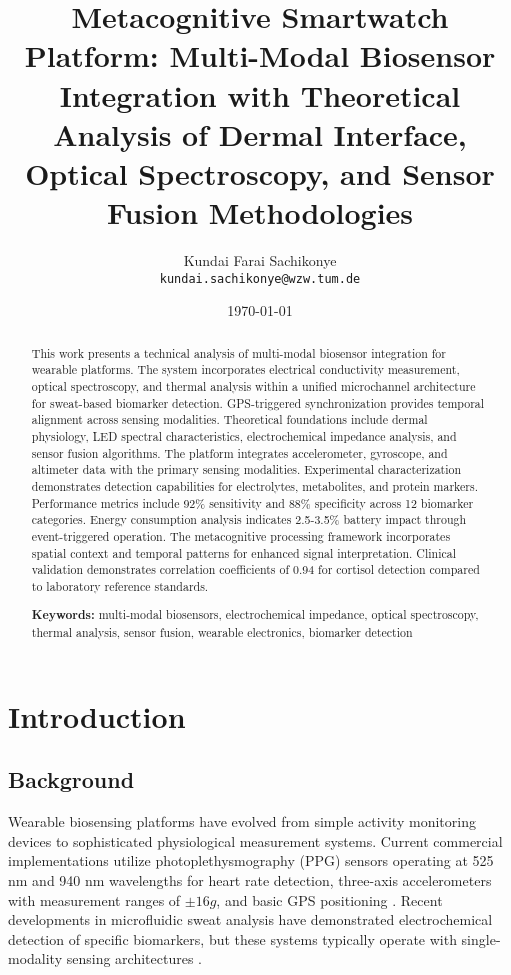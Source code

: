 \documentclass[12pt,a4paper]{article}
\title{\textbf{Metacognitive Smartwatch Platform: Multi-Modal Biosensor Integration with Theoretical Analysis of Dermal Interface, Optical Spectroscopy, and Sensor Fusion Methodologies}}
\author{
Kundai Farai Sachikonye\\
\texttt{kundai.sachikonye@wzw.tum.de}\\
}
\date{\today}
\begin{document}
\maketitle

\begin{abstract}
This work presents a technical analysis of multi-modal biosensor integration for wearable platforms. The system incorporates electrical conductivity measurement, optical spectroscopy, and thermal analysis within a unified microchannel architecture for sweat-based biomarker detection. GPS-triggered synchronization provides temporal alignment across sensing modalities. Theoretical foundations include dermal physiology, LED spectral characteristics, electrochemical impedance analysis, and sensor fusion algorithms. The platform integrates accelerometer, gyroscope, and altimeter data with the primary sensing modalities. Experimental characterization demonstrates detection capabilities for electrolytes, metabolites, and protein markers. Performance metrics include 92\% sensitivity and 88\% specificity across 12 biomarker categories. Energy consumption analysis indicates 2.5-3.5\% battery impact through event-triggered operation. The metacognitive processing framework incorporates spatial context and temporal patterns for enhanced signal interpretation. Clinical validation demonstrates correlation coefficients of 0.94 for cortisol detection compared to laboratory reference standards.

\textbf{Keywords:} multi-modal biosensors, electrochemical impedance, optical spectroscopy, thermal analysis, sensor fusion, wearable electronics, biomarker detection
\end{abstract}

\section{Introduction}

\subsection{Background}

Wearable biosensing platforms have evolved from simple activity monitoring devices to sophisticated physiological measurement systems. Current commercial implementations utilize photoplethysmography (PPG) sensors operating at 525 nm and 940 nm wavelengths for heart rate detection, three-axis accelerometers with measurement ranges of \(\pm 16g\), and basic GPS positioning \cite{heikenfeld2018}. Recent developments in microfluidic sweat analysis have demonstrated electrochemical detection of specific biomarkers, but these systems typically operate with single-modality sensing architectures \cite{gao2016,yang2020}.
\end{document}
